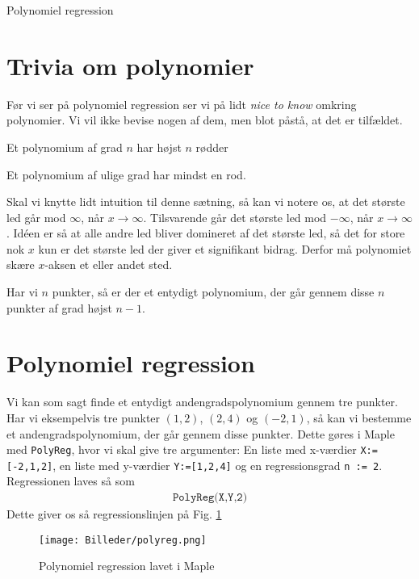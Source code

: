 \begin{center}
\Huge
Polynomiel regression
\end{center}
\section*{Trivia om polynomier}

Før vi ser på polynomiel regression ser vi på lidt \textit{nice to know} omkring polynomier. Vi vil ikke bevise nogen af dem, men blot påstå, at det er tilfældet.
\begin{setn}
Et polynomium af grad $n$ har højst $n$ rødder
\end{setn}
\begin{setn}
Et polynomium af ulige grad har mindst en rod.
\end{setn}
Skal vi knytte lidt intuition til denne sætning, så kan vi notere os, at det største led går mod $\infty$, når $x\to \infty$. Tilsvarende går det største led mod $-\infty$, når $x \to \infty$. Idéen er så at alle andre led bliver domineret af det største led, så det for store nok $x$ kun er det største led der giver et signifikant bidrag. Derfor må polynomiet skære $x$-aksen et eller andet sted.
\begin{setn}
Har vi $n$ punkter, så er der et entydigt polynomium, der går gennem disse $n$ punkter af grad højst $n-1$. 
\end{setn}


\section*{Polynomiel regression}
Vi kan som sagt finde et entydigt andengradspolynomium gennem tre punkter. Har vi eksempelvis tre punkter $(1,2)$, $(2,4)$ og $(-2,1)$, så kan vi bestemme et andengradspolynomium, der går gennem disse punkter. Dette gøres i Maple med \texttt{PolyReg}, hvor vi skal give tre argumenter: En liste med x-værdier \texttt{X:=[-2,1,2]}, en liste med y-værdier \texttt{Y:=[1,2,4]} og en regressionsgrad \texttt{n := 2}. Regressionen laves så som
\begin{align*}
\texttt{PolyReg(X,Y,2)}
\end{align*}
Dette giver os så regressionslinjen på Fig. \ref{fig:polyreg}
\begin{figure}[H]
\centering
\texttt{[image: Billeder/polyreg.png]}
\caption{Polynomiel regression lavet i Maple}
\label{fig:polyreg}
\end{figure}

